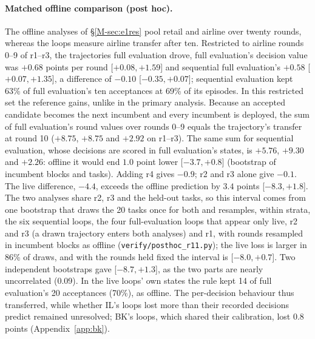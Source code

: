 \documentclass[11pt]{article}
\begin{document}
\paragraph{Matched offline comparison (post hoc).} The offline analyses of \S\ref*{M-sec:e1res} pool retail and airline over twenty rounds, whereas the loops measure airline transfer after ten. Restricted to airline rounds 0--9 of r1--r3, the trajectories full evaluation drove, full evaluation's decision value was $+0.68$ points per round [$+0.08,+1.59$] and sequential full evaluation's $+0.58$ [$+0.07,+1.35$], a difference of $-0.10$ [$-0.35,+0.07$]; sequential evaluation kept 63\% of full evaluation's ten acceptances at 69\% of its episodes. In this restricted set the reference gains, unlike in the primary analysis. Because an accepted candidate becomes the next incumbent and every incumbent is deployed, the sum of full evaluation's round values over rounds 0--9 equals the trajectory's transfer at round 10 ($+8.75$, $+8.75$ and $+2.92$ on r1--r3). The same sum for sequential evaluation, whose decisions are scored in full evaluation's states, is $+5.76$, $+9.30$ and $+2.26$: offline it would end $1.0$ point lower [$-3.7,+0.8$] (bootstrap of incumbent blocks and tasks). Adding r4 gives $-0.9$; r2 and r3 alone give $-0.1$. The live difference, $-4.4$, exceeds the offline prediction by $3.4$ points [$-8.3,+1.8$]. The two analyses share r2, r3 and the held-out tasks, so this interval comes from one bootstrap that draws the 20 tasks once for both and resamples, within strata, the six sequential loops, the four full-evaluation loops that appear only live, r2 and r3 (a drawn trajectory enters both analyses) and r1, with rounds resampled in incumbent blocks as offline (\texttt{verify/posthoc\_r11.py}); the live loss is larger in 86\% of draws, and with the rounds held fixed the interval is [$-8.0,+0.7$]. Two independent bootstraps gave [$-8.7,+1.3$], as the two parts are nearly uncorrelated (0.09). In the live loops' own states the rule kept 14 of full evaluation's 20 acceptances (70\%), as offline. The per-decision behaviour thus transferred, while whether IL's loops lost more than their recorded decisions predict remained unresolved; BK's loops, which shared their calibration, lost 0.8 points (Appendix~\ref{app:bk}).
\end{document}
